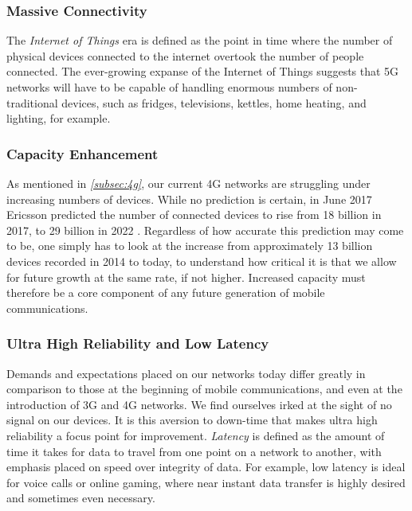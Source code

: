 \documentclass[journal]{IEEEtran}
\begin{document}
\subsubsection{Massive Connectivity}
The \textit{Internet of Things} era is defined as the point in time where the number of physical devices connected to the internet overtook the number of people connected. The ever-growing expanse of the Internet of Things suggests that 5G networks will have to be capable of handling enormous numbers of non-traditional devices, such as fridges, televisions, kettles, home heating, and lighting, for example.

\subsubsection{Capacity Enhancement}
As mentioned in \textit{\ref{subsec:4g}}, our current 4G networks are struggling under increasing numbers of devices. While no prediction is certain, in June 2017 Ericsson predicted the number of connected devices to rise from 18 billion in 2017, to 29 billion in 2022 \cite{ericssondev}. Regardless of how accurate this prediction may come to be, one simply has to look at the increase from approximately 13 billion devices recorded in 2014 \cite{ericssondev} to today, to understand how critical it is that we allow for future growth at the same rate, if not higher. Increased capacity must therefore be a core component of any future generation of mobile communications.

\subsubsection{Ultra High Reliability and Low Latency}
Demands and expectations placed on our networks today differ greatly in comparison to those at the beginning of mobile communications, and even at the introduction of 3G and 4G networks. We find ourselves irked at the sight of no signal on our devices. It is this aversion to down-time that makes ultra high reliability a focus point for improvement. \textit{Latency} is defined as the amount of time it takes for data to travel from one point on a network to another, with emphasis placed on speed over integrity of data. For example, low latency is ideal for voice calls or online gaming, where near instant data transfer is highly desired and sometimes even necessary.
\end{document}

